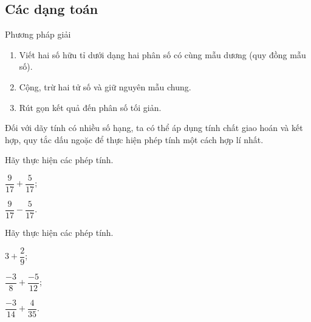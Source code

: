\subsection{Các dạng toán}
\begin{dang}
	Phương pháp giải
\begin{enumerate}[\tickEX]
	\item Viết hai số hữu tỉ dưới dạng hai phân số có cùng mẫu dương (quy đồng mẫu số).
	\item Cộng, trừ hai tử số và giữ nguyên mẫu chung.
	\item Rút gọn kết quả đến phân số tối giản.
\end{enumerate}
\end{dang}
\begin{note}
	Đối với dãy tính có nhiều số hạng, ta có thể áp dụng tính chất giao hoán và kết hợp, quy tắc dấu ngoặc để thực hiện phép tính một cách hợp lí nhất.
\end{note}
\begin{vd}
	Hãy thực hiện các phép tính.
	\begin{listEX}[2]
		\item $\dfrac{9}{17}+\dfrac{5}{17}$;
		\item $\dfrac{9}{17}-\dfrac{5}{17}$.
	\end{listEX}
\end{vd}
\begin{vd}
	Hãy thực hiện các phép tính.
\begin{listEX}[3]
	\item $3+\dfrac{2}{9}$;
	\item $\dfrac{-3}{8}+\dfrac{-5}{12}$;
	\item $\dfrac{-3}{14}+\dfrac{4}{35}$.
	
\end{listEX}
\end{vd}

